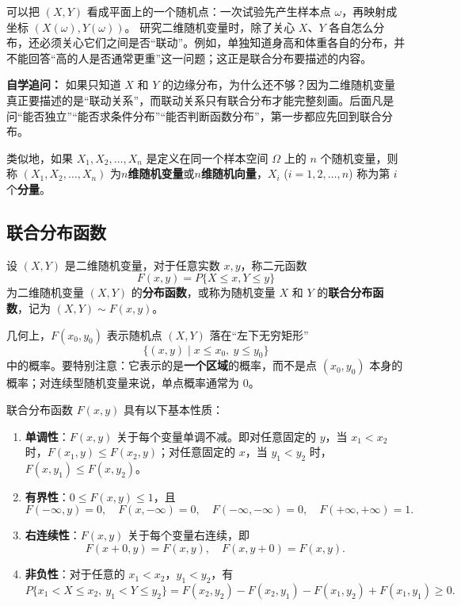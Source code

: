 ﻿\documentclass[lang=cn,11pt]{elegantbook}
\begin{document}
\begin{note}
可以把 \((X,Y)\) 看成平面上的一个随机点：一次试验先产生样本点 \(\omega\)，再映射成坐标 \((X(\omega),Y(\omega))\)。
研究二维随机变量时，除了关心 \(X\)、\(Y\) 各自怎么分布，还必须关心它们之间是否“联动”。例如，单独知道身高和体重各自的分布，并不能回答“高的人是否通常更重”这一问题；这正是联合分布要描述的内容。
\end{note}

\begin{note}
\textbf{自学追问：} 如果只知道 \(X\) 和 \(Y\) 的边缘分布，为什么还不够？因为二维随机变量真正要描述的是“联动关系”，而联动关系只有联合分布才能完整刻画。后面凡是问“能否独立”“能否求条件分布”“能否判断函数分布”，第一步都应先回到联合分布。
\end{note}

类似地，如果 $X_1,X_2,\dots,X_n$ 是定义在同一个样本空间 $\Omega$ 上的 $n$ 个随机变量，则称 $(X_1,X_2,\dots,X_n)$ 为\textbf{$n$维随机变量}或\textbf{$n$维随机向量}，$X_i$ ($i=1,2,\dots,n$) 称为第 $i$ 个\textbf{分量}。

\subsection{联合分布函数}

\begin{definition}[联合分布函数] \label{def:joint-df}
设 $(X,Y)$ 是二维随机变量，对于任意实数 $x,y$，称二元函数
\[
F(x,y) = P\{X \leqslant x, Y \leqslant y\}
\]
为二维随机变量 $(X,Y)$ 的\textbf{分布函数}，或称为随机变量 $X$ 和 $Y$ 的\textbf{联合分布函数}，记为 $(X,Y) \sim F(x,y)$。
\end{definition}

\begin{note}
几何上，$F(x_0,y_0)$ 表示随机点 $(X,Y)$ 落在“左下无穷矩形”
\[
\{(x,y)\mid x\le x_0,\ y\le y_0\}
\]
中的概率。要特别注意：它表示的是\textbf{一个区域}的概率，而不是点 $(x_0,y_0)$ 本身的概率；对连续型随机变量来说，单点概率通常为 $0$。
\end{note}

\begin{property}\label{prop:joint-df}
联合分布函数 $F(x,y)$ 具有以下基本性质：
\begin{enumerate}
    \item \textbf{单调性}：$F(x,y)$ 关于每个变量单调不减。即对任意固定的 $y$，当 $x_1 < x_2$ 时，$F(x_1,y) \leqslant F(x_2,y)$；对任意固定的 $x$，当 $y_1 < y_2$ 时，$F(x,y_1) \leqslant F(x,y_2)$。
    \item \textbf{有界性}：$0 \leqslant F(x,y) \leqslant 1$，且
    \[
    F(-\infty, y) = 0, \quad F(x, -\infty) = 0, \quad F(-\infty, -\infty) = 0, \quad F(+\infty, +\infty) = 1.
    \]
    \item \textbf{右连续性}：$F(x,y)$ 关于每个变量右连续，即
    \[
    F(x+0, y) = F(x,y), \quad F(x, y+0) = F(x,y).
    \]
    \item \textbf{非负性}：对于任意的 $x_1 < x_2$，$y_1 < y_2$，有
    \[
    P\{x_1 < X \leqslant x_2,\ y_1 < Y \leqslant y_2\} = F(x_2,y_2) - F(x_2,y_1) - F(x_1,y_2) + F(x_1,y_1) \geqslant 0.
    \]
\end{enumerate}
\end{property}
\end{document}
